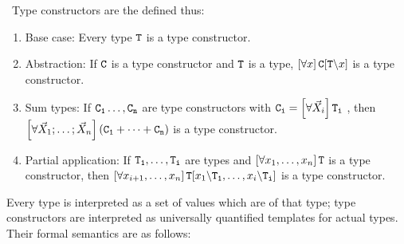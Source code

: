 \begin{definition}\label{def:typeCon}\
	Type constructors are the defined thus:
	\begin{enumerate}
		\item {\upshape Base case:} Every type $\mathtt{T}$ is a type constructor.
		\item {\upshape Abstraction:} If $\mathtt{C}$ is a type constructor and $\mathtt{T}$ is a type, $\left[\forall x \right] \mathtt{C}[\mathtt{T}\backslash x]$ is a type constructor.
		\item {\upshape Sum types:} If $\mathtt{C_1}\dots,\mathtt{C_n}$ are type constructors with $\mathtt{C_i} = \left[\forall \vec{X}_i \right] \mathtt{T_i}$ , then $\left[\forall \vec{X}_1; \dots; \vec{X}_n \right] (\mathtt{C_1} + \dots + \mathtt{C_n})$ is a type constructor.
		\item {\upshape Partial application:} If $\mathtt{T_1},\dots,\mathtt{T_i}$ \paren{$i < n$} are types and $\left[\forall x_1,\dots,x_n \right] \mathtt{T}$ is a type constructor, then $\left[\forall x_{i+1},\dots,x_n \right] \mathtt{T}[x_1\backslash \mathtt{T_1},\dots,x_i\backslash \mathtt{T_i}]$ is a type constructor.
	\end{enumerate}
\end{definition}

Every type is interpreted as a set of values which are of that type; type constructors are interpreted as universally quantified templates for actual types. Their formal semantics are as follows:

